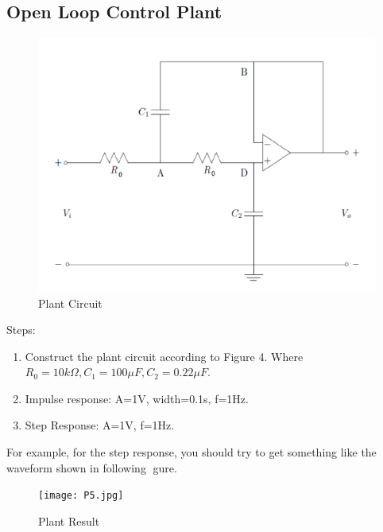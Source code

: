 \documentclass[12pt]{article}
\begin{document}
\subsection{Open Loop Control Plant}
\begin{figure}[H]
\centering
\includegraphics[scale=0.5]{P4.jpg}
\caption{Plant Circuit}
\end{figure}
Steps:
\begin{enumerate}
\item Construct the plant circuit according to Figure 4. Where $R_0=10k\Omega,C_1=100\mu F,C_2=0.22\mu F.$
\item Impulse response: A=1V, width=0.1s, f=1Hz. 
\item Step Response: A=1V, f=1Hz.
\end{enumerate}
For example, for the step response, you should try to get something like the waveform shown in following
gure.
\begin{figure}[H]
\centering
\texttt{[image: P5.jpg]}
\caption{Plant Result}
\end{figure}
\end{document}
